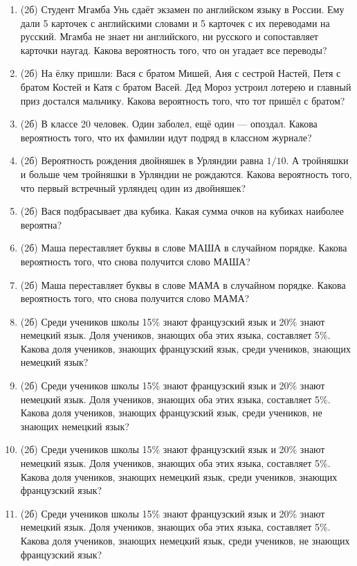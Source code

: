 \documentclass[a4paper, 12pt]{article}
\begin{document}
\newpage
\begin{enumerate}
  \item (2б) Студент Мгамба Унь сдаёт экзамен по английском языку в России. Ему дали 5 карточек с английскими словами и 5 карточек с их переводами на русский. Мгамба не знает ни английского, ни русского и сопоставляет карточки наугад. Какова вероятность того, что он угадает все переводы?
  \item (2б) На ёлку пришли: Вася с братом Мишей, Аня с сестрой Настей, Петя с братом Костей и Катя с братом Васей. Дед Мороз устроил лотерею и главный приз достался мальчику. Какова вероятность того, что тот пришёл с братом?
  \item (2б) В классе 20 человек. Один заболел, ещё один — опоздал. Какова вероятность того, что их фамилии идут подряд в классном журнале?
  \item (2б) Вероятность рождения двойняшек в Урляндии равна $1/10$. А тройняшки и больше чем тройняшки в Урляндии не рождаются. Какова вероятность того, что первый встречный урляндец один из двойняшек?
  \item (2б) Вася подбрасывает два кубика. Какая сумма очков на кубиках наиболее вероятна?
  \item (2б) Маша переставляет буквы в слове МАША в случайном порядке. Какова вероятность того, что снова получится слово МАША?
  \item (2б) Маша переставляет буквы в слове МАМА в случайном порядке. Какова вероятность того, что снова получится слово МАМА?
  \item (2б) Среди учеников школы 15\% знают французский язык и 20\% знают немецкий язык. Доля учеников, знающих оба этих языка, составляет 5\%. Какова доля учеников, знающих французский язык, среди учеников, знающих немецкий язык?
  \item (2б) Среди учеников школы 15\% знают французский язык и 20\% знают немецкий язык. Доля учеников, знающих оба этих языка, составляет 5\%. Какова доля учеников, знающих французский язык, среди учеников, не знающих немецкий язык?
  \item (2б) Среди учеников школы 15\% знают французский язык и 20\% знают немецкий язык. Доля учеников, знающих оба этих языка, составляет 5\%. Какова доля учеников, знающих немецкий язык, среди учеников, знающих французский язык?
  \item (2б) Среди учеников школы 15\% знают французский язык и 20\% знают немецкий язык. Доля учеников, знающих оба этих языка, составляет 5\%. Какова доля учеников, знающих немецкий язык, среди учеников, не знающих французский язык?

\end{enumerate}
\end{document}
